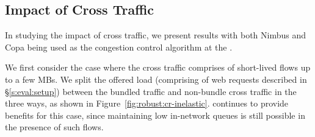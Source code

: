 \subsection{Impact of Cross Traffic}
In studying the impact of cross traffic, we present results with both Nimbus and Copa being used as the congestion control algorithm at the \inbox.


 We first consider the case where the cross traffic comprises of short-lived flows up to a few MBs.
We split the offered load (comprising of web requests described in \S\ref{s:eval:setup}) between the bundled traffic and non-bundle cross traffic in the three ways, as shown in Figure~\ref{fig:robust:cr-inelastic}. \name continues to provide benefits for this case, since maintaining low in-network queues is still possible in the presence of such flows.

